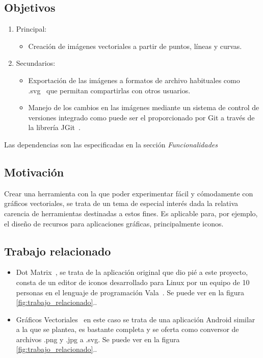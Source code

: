 \documentclass[a4paper,openright,12pt]{article}
\begin{document}
\subsection{Objetivos}
\begin{enumerate}
    \item Principal:
    \begin{itemize}
        \item Creación de imágenes vectoriales a partir de puntos, líneas y curvas.
    \end{itemize}

    \item Secundarios:
    \begin{itemize}
        \item Exportación de las imágenes a formatos de archivo habituales como \\
        .svg~\cite{SVG} que permitan compartirlas con otros usuarios.
        \item Manejo de los cambios en las imágenes mediante un sistema de control de versiones integrado como puede ser el proporcionado por Git a través de la librería JGit~\cite{JGit}.
    \end{itemize}
\end{enumerate}

Las dependencias son las especificadas en la sección \emph{Funcionalidades}

\subsection{Motivación}
Crear una herramienta con la que poder experimentar fácil y cómodamente con gráficos vectoriales, se trata de un tema de especial interés dada la relativa carencia de herramientas destinadas a estos fines.
Es aplicable para, por ejemplo, el diseño de recursos para aplicaciones gráficas, principalmente iconos.

\subsection{Trabajo relacionado}
\begin{itemize}
    \item Dot Matrix~\cite{Dot_Matrix}, se trata de la aplicación original que dio pié a este proyecto, consta de un editor de iconos desarrollado para Linux por un equipo de 10 personas en el lenguaje de programación Vala~\cite{Vala}. Se puede ver en la figura \ref{fig:trabajo_relacionado}..
    \item Gráficos Vectoriales~\cite{Graficos_Vectoriales} en este caso se trata de una aplicación Android similar a la que se plantea, es bastante completa y se oferta como conversor de archivos .png y .jpg a .svg. Se puede ver en la figura \ref{fig:trabajo_relacionado}..
\end{itemize}
\end{document}
